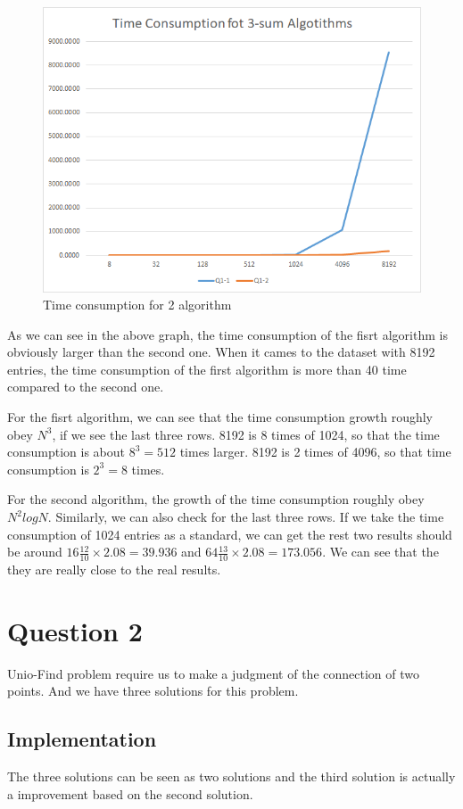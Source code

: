 \documentclass[conference]{IEEEtran}
\begin{document}
\begin{figure}[H]
    \centerline{\includegraphics[scale=0.5]{Pic/fig1.png}}
    \caption{Time consumption for 2 algorithm}
\end{figure}

As we can see in the above graph, the time consumption of the fisrt algorithm is obviously 
larger than the second one. When it cames to the dataset with 8192 entries, the time consumption
of the first algorithm is more than 40 time compared to the second one. 

For the fisrt algorithm, 
we can see that the time consumption growth roughly obey $N^3$, if we see the last three rows.
8192 is 8 times of 1024, so that the time consumption is about $8^3=512$ times larger. 8192 is 
2 times of 4096, so that time consumption is $2^3=8$ times. 

For the second algorithm, the growth of the time consumption roughly obey $N^2logN$. Similarly,
we can also check for the last three rows. If we take the time consumption of 1024 entries as
a standard, we can get the rest two results should be around $16\frac{12}{10}\times 2.08=39.936$
and $64\frac{13}{10}\times 2.08=173.056$. We can see that the they are really close to the real
results.

\section*{Question 2}
Unio-Find problem require us to make a judgment of the connection of 
two points. And we have three solutions for this problem.

\subsection*{Implementation}
The three solutions can be seen as two solutions and the third solution
is actually a improvement based on the second solution.
\end{document}
